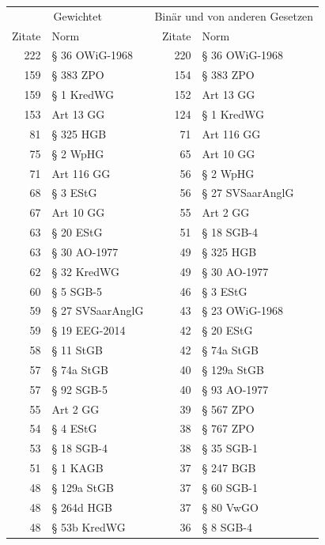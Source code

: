 \begin{tabular}{rl|rl}
\multicolumn{2}{c}{Gewichtet} & \multicolumn{2}{|c}{Binär und von anderen Gesetzen} \\
Zitate & Norm & Zitate & Norm \\
\midrule
222 & § 36 OWiG-1968 & 220 & § 36 OWiG-1968 \\
159 & § 383 ZPO & 154 & § 383 ZPO \\
159 & § 1 KredWG & 152 & Art 13 GG \\
153 & Art 13 GG & 124 & § 1 KredWG \\
81 & § 325 HGB & 71 & Art 116 GG \\
75 & § 2 WpHG & 65 & Art 10 GG \\
71 & Art 116 GG & 56 & § 2 WpHG \\
68 & § 3 EStG & 56 & § 27 SVSaarAnglG \\
67 & Art 10 GG & 55 & Art 2 GG \\
63 & § 20 EStG & 51 & § 18 SGB-4 \\
63 & § 30 AO-1977 & 49 & § 325 HGB \\
62 & § 32 KredWG & 49 & § 30 AO-1977 \\
60 & § 5 SGB-5 & 46 & § 3 EStG \\
59 & § 27 SVSaarAnglG & 43 & § 23 OWiG-1968 \\
59 & § 19 EEG-2014 & 42 & § 20 EStG \\
58 & § 11 StGB & 42 & § 74a StGB \\
57 & § 74a StGB & 40 & § 129a StGB \\
57 & § 92 SGB-5 & 40 & § 93 AO-1977 \\
55 & Art 2 GG & 39 & § 567 ZPO \\
54 & § 4 EStG & 38 & § 767 ZPO \\
53 & § 18 SGB-4 & 38 & § 35 SGB-1 \\
51 & § 1 KAGB & 37 & § 247 BGB \\
48 & § 129a StGB & 37 & § 60 SGB-1 \\
48 & § 264d HGB & 37 & § 80 VwGO \\
48 & § 53b KredWG & 36 & § 8 SGB-4 \\
\end{tabular}

